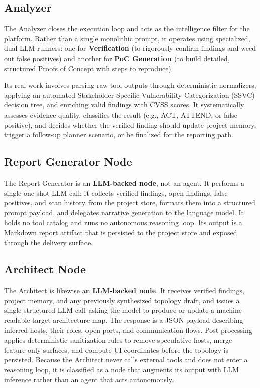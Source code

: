 \documentclass[12pt,a4paper]{report}
\begin{document}
\subsection{Analyzer}

The Analyzer closes the execution loop and acts as the intelligence filter for the
platform. Rather than a single monolithic prompt, it operates using specialized,
dual LLM runners: one for \textbf{Verification} (to rigorously confirm findings and
weed out false positives) and another for \textbf{PoC Generation} (to build detailed,
structured Proofs of Concept with steps to reproduce).

Its real work involves parsing raw tool outputs through deterministic normalizers,
applying an automated Stakeholder-Specific Vulnerability Categorization (SSVC)
decision tree, and enriching valid findings with CVSS scores. It systematically
assesses evidence quality, classifies the result (e.g., ACT, ATTEND, or false
positive), and decides whether the verified finding should update project memory,
trigger a follow-up planner scenario, or be finalized for the reporting path.

\subsection{Report Generator Node}

The Report Generator is an \textbf{LLM-backed node}, not an agent. It performs
a single one-shot LLM call: it collects verified findings, open findings, false
positives, and scan history from the project store, formats them into a
structured prompt payload, and delegates narrative generation to the language
model. It holds no tool catalog and runs no autonomous reasoning loop. Its
output is a Markdown report artifact that is persisted to the project store and
exposed through the delivery surface.

\subsection{Architect Node}

The Architect is likewise an \textbf{LLM-backed node}. It receives verified
findings, project memory, and any previously synthesized topology draft, and
issues a single structured LLM call asking the model to produce or update a
machine-readable target architecture map. The response is a JSON payload
describing inferred hosts, their roles, open ports, and communication flows.
Post-processing applies deterministic sanitization rules to remove speculative
hosts, merge feature-only surfaces, and compute UI coordinates before the
topology is persisted. Because the Architect never calls external tools and does
not enter a reasoning loop, it is classified as a node that augments its output
with LLM inference rather than an agent that acts autonomously.
\end{document}
